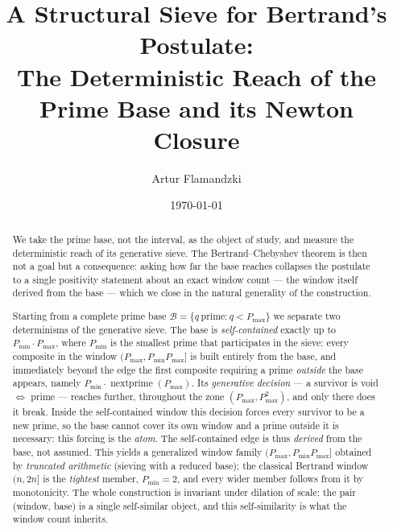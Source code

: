 \documentclass[11pt,a4paper]{amsart}
\title{A Structural Sieve for Bertrand's Postulate:\\
The Deterministic Reach of the Prime Base and its Newton Closure}
\author{Artur Flamandzki}
\date{\today}
\theoremstyle{plain}
\theoremstyle{definition}
\theoremstyle{plain}
\theoremstyle{remark}
\begin{document}
\begin{abstract}
We take the prime base, not the interval, as the object of study, and measure the
deterministic reach of its generative sieve. The Bertrand--Chebyshev theorem is then not
a goal but a consequence: asking how far the base reaches collapses the postulate to a
single positivity statement about an exact window count --- the window itself derived from
the base --- which we close in the natural generality of the construction.

Starting from a complete prime base $\mathcal{B}=\{q\ \text{prime}: q<P_{\max}\}$ we
separate two determinisms of the generative sieve. The base is \emph{self-contained}
exactly up to $P_{\min}\cdot P_{\max}$, where $P_{\min}$ is the smallest prime that
participates in the sieve: every composite in the window $(P_{\max}, P_{\min}P_{\max}]$ is
built entirely from the base, and immediately beyond the edge the first composite requiring
a prime \emph{outside} the base appears, namely $P_{\min}\cdot\operatorname{nextprime}(P_{\max})$.
Its \emph{generative decision} --- a survivor is void $\Leftrightarrow$ prime --- reaches
further, throughout the zone $(P_{\max}, P_{\max}^2)$, and only there does it break. Inside the
self-contained window this decision forces every survivor to be a new prime, so the base
cannot cover its own window and a prime outside it is necessary: this forcing is the
\emph{atom}. The self-contained edge is thus \emph{derived} from the base, not assumed. This yields a generalized window
family $(P_{\max}, P_{\min}P_{\max}]$ obtained by \emph{truncated arithmetic}
(sieving with a reduced base); the classical Bertrand window $(n, 2n]$ is the
\emph{tightest} member, $P_{\min}=2$, and every wider member follows from it by
monotonicity. The whole construction is invariant under dilation of scale: the pair
(window, base) is a single self-similar object, and this self-similarity is what the
window count inherits.


\end{abstract}
\end{document}

